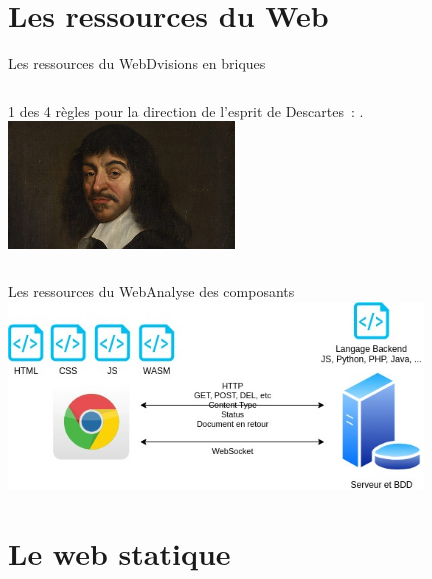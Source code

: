 \documentclass{beamer}
\begin{document}
    \section{Les ressources du Web}\label{sec:ressources}

    \begin{frame}{Les ressources du Web}{Dvisions en briques}
        \begin{columns}
            1 des 4 règles pour la direction de l'esprit de Descartes~: .
            \centering
            \includegraphics[width=6cm]{image/Descartes}
        \end{columns}
    \end{frame}

    \begin{frame}{Les ressources du Web}{Analyse des composants}
        \centering
        \includegraphics[width=11cm]{image/web-stakeholders.drawio}
    \end{frame}


    \section{Le web statique}\label{sec:static}
\end{document}
